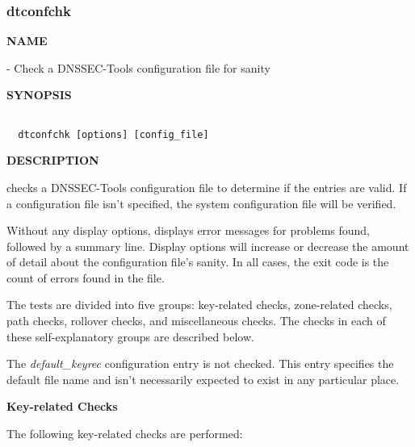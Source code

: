 \clearpage

\subsubsection{dtconfchk}

{\bf NAME}

 - Check a DNSSEC-Tools configuration file for sanity

{\bf SYNOPSIS}

\begin{verbatim}

  dtconfchk [options] [config_file]

\end{verbatim}

{\bf DESCRIPTION}

 checks a DNSSEC-Tools configuration file to determine if the
entries are valid.  If a configuration file isn't specified, the system
configuration file will be verified.

Without any display options,  displays error messages for
problems found, followed by a summary line.  Display options will increase or
decrease the amount of detail about the configuration file's sanity.  In all
cases, the exit code is the count of errors found in the file.

The tests are divided into five groups:  key-related checks, zone-related
checks, path checks, rollover checks, and miscellaneous checks.  The checks
in each of these self-explanatory groups are described below.

The {\it default\_keyrec} configuration entry is not checked.  This entry
specifies the default  file name and isn't necessarily expected
to exist in any particular place.

{\bf Key-related Checks}

The following key-related checks are performed:

